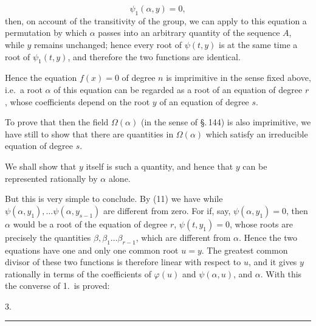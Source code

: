 \[
\psi_1(\alpha, y) = 0,
\]
then, on account of the transitivity of the group, we can apply to this equation a permutation by which $\alpha$ passes into an arbitrary quantity of the sequence $A$, while $y$ remains unchanged; hence every root of $\psi(t, y)$ is at the same time a root of $\psi_1(t, y)$, and therefore the two functions are identical.

Hence the equation $f(x) = 0$ of degree $n$ is imprimitive in the sense fixed above, i.e.\ a root $\alpha$ of this equation can be regarded as a root of an equation of degree $r$, whose coefficients depend on the root $y$ of an equation of degree $s$.

To prove that then the field $\Omega(\alpha)$ (in the sense of \S.\,144) is also imprimitive, we have still to show that there are quantities in $\Omega(\alpha)$ which satisfy an irreducible equation of degree $s$.

We shall show that $y$ itself is such a quantity, and hence that $y$ can be represented rationally by $\alpha$ alone.

But this is very simple to conclude. By (11) we have
while $\psi(\alpha, y_1), \ldots \psi(\alpha, y_{s-1})$ are different from zero. For if, say, $\psi(\alpha, y_1) = 0$, then $\alpha$ would be a root of the equation of degree $r$, $\psi(t, y_1) = 0$, whose roots are precisely the quantities $\beta, \beta_1 \ldots \beta_{r-1}$, which are different from $\alpha$. Hence the two equations
have one and only one common root $u = y$. The greatest common divisor of these two functions is therefore linear with respect to $u$, and it gives $y$ rationally in terms of the coefficients of $\varphi(u)$ and $\psi(\alpha, u)$, and  $\alpha$. With this the converse of 1.\ is proved:

3. 

\begin{center}
\rule{3cm}{0.4pt}
\end{center}
